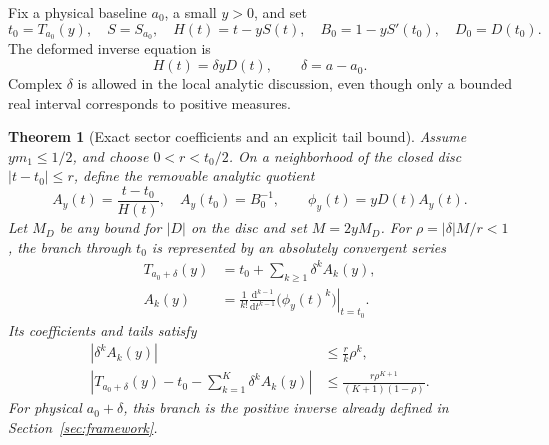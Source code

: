 \documentclass[11pt,a4paper]{article}
\numberwithin{equation}{section}
\newtheorem{theorem}{Theorem}[section]
\theoremstyle{definition}
\theoremstyle{remark}
\begin{document}
Fix a physical baseline \(a_0\), a small \(y>0\), and set
\begin{equation}
 t_0=T_{a_0}(y),\quad S=S_{a_0},\quad
 H(t)=t-yS(t),\quad B_0=1-yS'(t_0),\quad D_0=D(t_0).
 \label{eq:sector-data}
\end{equation}
The deformed inverse equation is
\begin{equation}
 H(t)=\delta yD(t),\qquad \delta=a-a_0.
 \label{eq:deformed-equation}
\end{equation}
Complex \(\delta\) is allowed in the local analytic discussion, even
though only a bounded real interval corresponds to positive measures.

\begin{theorem}[Exact sector coefficients and an explicit tail bound]
\label{thm:sectors}
Assume \(ym_1\le1/2\), and choose \(0<r<t_0/2\). On a neighborhood
of the closed disc \(|t-t_0|\le r\), define the removable analytic quotient
\begin{equation}
 A_y(t)=\frac{t-t_0}{H(t)},\quad A_y(t_0)=B_0^{-1},\qquad
 \phi_y(t)=yD(t)A_y(t).
 \label{eq:phi}
\end{equation}
Let \(M_D\) be any bound for \(|D|\) on the disc and set \(M=2yM_D\).
For \(\rho=|\delta|M/r<1\), the branch through \(t_0\) is represented by
an absolutely convergent series
\begin{align}
 T_{a_0+\delta}(y)&=t_0+\sum_{k\ge1}\delta^k A_k(y),\label{eq:sectors}\\
 A_k(y)&=\frac1{k!}
  \left.\frac{\mathrm d^{k-1}}{\mathrm dt^{k-1}}
  \bigl(\phi_y(t)^k\bigr)\right|_{t=t_0}.\label{eq:sector-coefficients}
\end{align}
Its coefficients and tails satisfy
\begin{align}
 |\delta^kA_k(y)|&\le\frac r k\rho^k,\label{eq:sector-bound}\\
 \left|T_{a_0+\delta}(y)-t_0-\sum_{k=1}^K\delta^kA_k(y)\right|
 &\le\frac{r\rho^{K+1}}{(K+1)(1-\rho)}.\label{eq:sector-tail}
\end{align}
For physical \(a_0+\delta\), this branch is the positive inverse already
defined in Section~\ref{sec:framework}.
\end{theorem}
\end{document}
